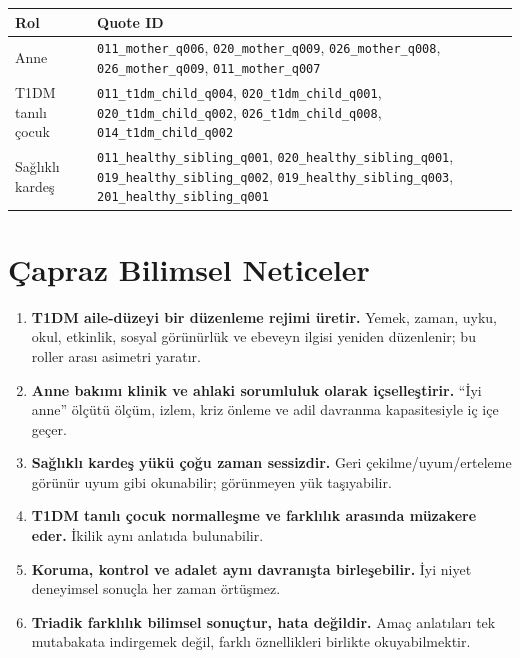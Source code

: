 \documentclass[
  turkish,
  a4paper,
  DIV=11,
  numbers=noendperiod]{scrreprt}
\newcounter{none} %
\providecommand{\tightlist}{%
  \setlength{\itemsep}{0pt}\setlength{\parskip}{0pt}}
\begin{document}
{\def\LTcaptype{none} %
\begin{longtable}[]{@{}
  >{\raggedright\arraybackslash}p{}
  >{\raggedright\arraybackslash}p{}@{}}
\toprule\noalign{}
\begin{minipage}[b]{\linewidth}\raggedright
Rol
\end{minipage} & \begin{minipage}[b]{\linewidth}\raggedright
Quote ID
\end{minipage} \\
\midrule\noalign{}
\endhead
\bottomrule\noalign{}
\endlastfoot
Anne & \texttt{011\_mother\_q006}, \texttt{020\_mother\_q009},
\texttt{026\_mother\_q008}, \texttt{026\_mother\_q009},
\texttt{011\_mother\_q007} \\
T1DM tanılı çocuk & \texttt{011\_t1dm\_child\_q004},
\texttt{020\_t1dm\_child\_q001}, \texttt{020\_t1dm\_child\_q002},
\texttt{026\_t1dm\_child\_q008}, \texttt{014\_t1dm\_child\_q002} \\
Sağlıklı kardeş & \texttt{011\_healthy\_sibling\_q001},
\texttt{020\_healthy\_sibling\_q001},
\texttt{019\_healthy\_sibling\_q002},
\texttt{019\_healthy\_sibling\_q003},
\texttt{201\_healthy\_sibling\_q001} \\
\end{longtable}
}

\chapter{Çapraz Bilimsel Neticeler}\label{sec-capraz}

\begin{enumerate}
\def\labelenumi{\arabic{enumi}.}
\tightlist
\item
  \textbf{T1DM aile-düzeyi bir düzenleme rejimi üretir.} Yemek, zaman,
  uyku, okul, etkinlik, sosyal görünürlük ve ebeveyn ilgisi yeniden
  düzenlenir; bu roller arası asimetri yaratır.
\item
  \textbf{Anne bakımı klinik ve ahlaki sorumluluk olarak içselleştirir.}
  ``İyi anne'' ölçütü ölçüm, izlem, kriz önleme ve adil davranma
  kapasitesiyle iç içe geçer.
\item
  \textbf{Sağlıklı kardeş yükü çoğu zaman sessizdir.} Geri
  çekilme/uyum/erteleme görünür uyum gibi okunabilir; görünmeyen yük
  taşıyabilir.
\item
  \textbf{T1DM tanılı çocuk normalleşme ve farklılık arasında müzakere
  eder.} İkilik aynı anlatıda bulunabilir.
\item
  \textbf{Koruma, kontrol ve adalet aynı davranışta birleşebilir.} İyi
  niyet deneyimsel sonuçla her zaman örtüşmez.
\item
  \textbf{Triadik farklılık bilimsel sonuçtur, hata değildir.} Amaç
  anlatıları tek mutabakata indirgemek değil, farklı öznellikleri
  birlikte okuyabilmektir.
\end{enumerate}
\end{document}
